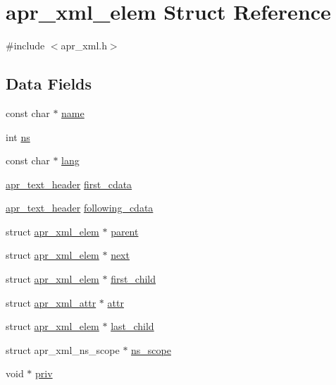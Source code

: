 \hypertarget{structapr__xml__elem}{\section{apr\-\_\-xml\-\_\-elem Struct Reference}
\label{structapr__xml__elem}
}


{\ttfamily \#include $<$apr\-\_\-xml.\-h$>$}

\subsection*{Data Fields}
\begin{DoxyCompactItemize}
\item 
const char $\ast$ \hyperlink{structapr__xml__elem_a5b2fb684a9cfb244f88ad88f539fe3d6}{name}
\item 
int \hyperlink{structapr__xml__elem_a613ea31964572df7b41f5a9da8d0982e}{ns}
\item 
const char $\ast$ \hyperlink{structapr__xml__elem_a9a48a384f579816f62a7369aeb8b1a0c}{lang}
\item 
\hyperlink{structapr__text__header}{apr\-\_\-text\-\_\-header} \hyperlink{structapr__xml__elem_a732e8acd00e43330674fde57ef87163f}{first\-\_\-cdata}
\item 
\hyperlink{structapr__text__header}{apr\-\_\-text\-\_\-header} \hyperlink{structapr__xml__elem_a8d64c5343354e34c1cc7ac67f51cc89a}{following\-\_\-cdata}
\item 
struct \hyperlink{structapr__xml__elem}{apr\-\_\-xml\-\_\-elem} $\ast$ \hyperlink{structapr__xml__elem_a0fd30b383f2659a9ef245c2e99cb707d}{parent}
\item 
struct \hyperlink{structapr__xml__elem}{apr\-\_\-xml\-\_\-elem} $\ast$ \hyperlink{structapr__xml__elem_a8687253d504b1c1363c47117611042ac}{next}
\item 
struct \hyperlink{structapr__xml__elem}{apr\-\_\-xml\-\_\-elem} $\ast$ \hyperlink{structapr__xml__elem_a620a28337f36592d4cb1f6dd3d2e97e0}{first\-\_\-child}
\item 
struct \hyperlink{structapr__xml__attr}{apr\-\_\-xml\-\_\-attr} $\ast$ \hyperlink{structapr__xml__elem_aa9c71585c0b2a32269852047aebdd61c}{attr}
\item 
struct \hyperlink{structapr__xml__elem}{apr\-\_\-xml\-\_\-elem} $\ast$ \hyperlink{structapr__xml__elem_ad4f49811fc36f2377c72ac2c19e57abd}{last\-\_\-child}
\item 
struct apr\-\_\-xml\-\_\-ns\-\_\-scope $\ast$ \hyperlink{structapr__xml__elem_addfd70c22965dca4f7574639424a0c32}{ns\-\_\-scope}
\item 
void $\ast$ \hyperlink{structapr__xml__elem_a0bc4296aedb5d047325f86080604d939}{priv}
\end{DoxyCompactItemize}


